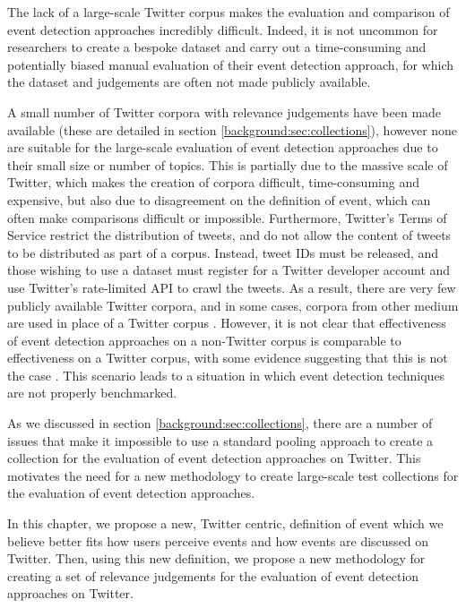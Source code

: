 The lack of a large-scale Twitter corpus makes the evaluation and comparison of event detection approaches incredibly difficult.
Indeed, it is not uncommon for researchers to create a bespoke dataset and carry out a time-consuming and potentially biased manual evaluation of their event detection approach, for which the dataset and judgements are often not made publicly available.

A small number of Twitter corpora with relevance judgements have been made available (these are detailed in section \ref{background:sec:collections}), however none are suitable for the large-scale evaluation of event detection approaches due to their small size or number of topics.
This is partially due to the massive scale of Twitter, which makes the creation of corpora difficult, time-consuming and expensive, but also due to disagreement on the definition of event, which can often make comparisons difficult or impossible.
Furthermore, Twitter's Terms of Service restrict the distribution of tweets, and do not allow the content of tweets to be distributed as part of a corpus.
Instead, tweet IDs must be released, and those wishing to use a dataset must register for a Twitter developer account and use Twitter's rate-limited API to crawl the tweets.
As a result, there are very few publicly available Twitter corpora, and in some cases, corpora from other medium are used in place of a Twitter corpus \citep{Aggarwal12,Petrovic:2010:SFS:1857999.1858020,Petrovic:2012:UPI:2382029.2382072}.
However, it is not clear that effectiveness of event detection approaches on a non-Twitter corpus is comparable to effectiveness on a Twitter corpus, with some evidence suggesting that this is not the case \citep{Petrovic:2012:UPI:2382029.2382072}.
This scenario leads to a situation in which event detection techniques are not properly benchmarked.

As we discussed in section \ref{background:sec:collections}, there are a number of issues that make it impossible to use a standard pooling approach to create a collection for the evaluation of event detection approaches on Twitter.
This motivates the need for a new methodology to create large-scale test collections for the evaluation of event detection approaches.

In this chapter, we propose a new, Twitter centric, definition of event which we believe better fits how users perceive events and how events are discussed on Twitter.
Then, using this new definition, we propose a new methodology for creating a set of relevance judgements for the evaluation of event detection approaches on Twitter.


